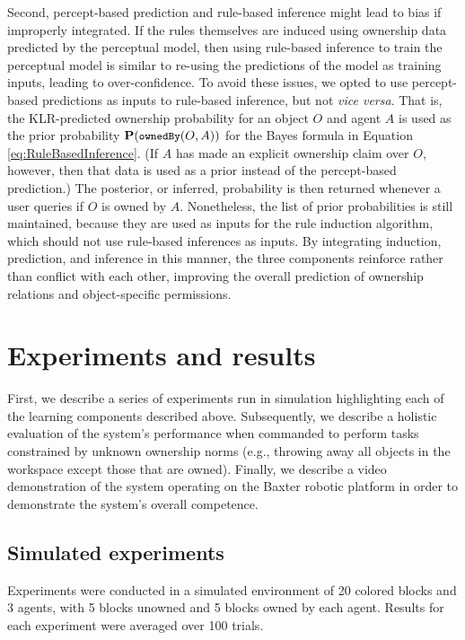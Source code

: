 \documentclass[letterpaper]{article} %
\begin{document}
Second, percept-based prediction and rule-based inference might lead to bias if improperly integrated. If the rules themselves are induced using ownership data predicted by the perceptual model, then using rule-based inference to train the perceptual model is similar to re-using the predictions of the model as training inputs, leading to over-confidence. To avoid these issues, we opted to use percept-based predictions as inputs to rule-based inference, but not \emph{vice versa}. That is, the KLR-predicted ownership probability for an object $O$ and agent $A$ is used as the prior probability $\small{\mathbf{P}(\texttt{ownedBy}(O,A))}$ for the Bayes formula in Equation \ref{eq:RuleBasedInference}. (If $A$ has made an explicit ownership claim over $O$, however, then that data is used as a prior instead of the percept-based prediction.) The posterior, or inferred, probability is then returned whenever a user queries if $O$ is owned by $A$. Nonetheless, the list of prior probabilities is still maintained, because they are used as inputs for the rule induction algorithm, which should not use rule-based inferences as inputs. By integrating induction, prediction, and inference in this manner, the three components reinforce rather than conflict with each other, improving the overall prediction of ownership relations and object-specific permissions.

\section{Experiments and results}

First, we describe a series of experiments run in simulation highlighting each of the learning components described above. Subsequently, we describe a holistic evaluation of the system's performance when commanded to perform tasks constrained by unknown ownership norms (e.g., throwing away all objects in the workspace except those that are owned). Finally, we describe a video demonstration of the system operating on the Baxter robotic platform in order to demonstrate the system's overall competence.

\subsection{Simulated experiments}

Experiments were conducted in a simulated environment of 20 colored blocks and 3 agents, with 5 blocks unowned and 5 blocks owned by each agent. Results for each experiment were averaged over 100 trials.
\end{document}
